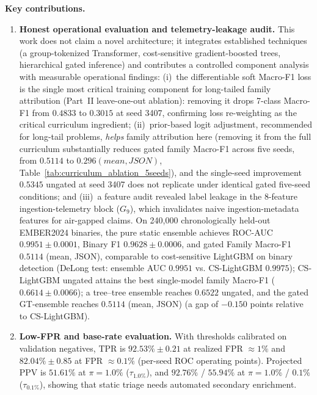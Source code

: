 \documentclass[Number]{sn-jnl}
\begin{document}
\noindent\textbf{Key contributions.}
\begin{enumerate}[leftmargin=*]
\item \textbf{Honest operational evaluation and telemetry-leakage audit.}
This work does not claim a novel architecture; it integrates established techniques (a group-tokenized Transformer, cost-sensitive gradient-boosted trees, hierarchical gated inference) and contributes a controlled component analysis with measurable operational findings: (i)~the differentiable soft Macro-F1 loss is the single most critical training component for long-tailed family attribution (Part~II leave-one-out ablation): removing it drops 7-class Macro-F1 from $0.4833$ to $0.3015$ at seed 3407, confirming loss re-weighting as the critical curriculum ingredient; (ii)~prior-based logit adjustment, recommended for long-tail problems, \emph{helps} family attribution here (removing it from the full curriculum substantially reduces gated family Macro-F1 across five seeds, from $0.5114$ to $0.296 (mean, JSON)$, Table~\ref{tab:curriculum_ablation_5seeds}), and the single-seed improvement $0.5345$ ungated at seed 3407 does not replicate under identical gated five-seed conditions; and (iii)~a feature audit revealed label leakage in the 8-feature ingestion-telemetry block ($G_9$), which invalidates naive ingestion-metadata features for air-gapped claims. On 240{,}000 chronologically held-out EMBER2024 binaries, the pure static ensemble achieves ROC-AUC $0.9951\pm0.0001$, Binary F1 $0.9628\pm0.0006$, and gated Family Macro-F1 $0.5114$ (mean, JSON), comparable to cost-sensitive LightGBM on binary detection (DeLong test: ensemble AUC $0.9951$ vs. CS-LightGBM $0.9975$); CS-LightGBM ungated attains the best single-model family Macro-F1 ($0.6614\pm0.0066$); a tree--tree ensemble reaches $0.6522$ ungated, and the gated GT-ensemble reaches $0.5114$ (mean, JSON) (a gap of $-0.150$ points relative to CS-LightGBM).

\item \textbf{Low-FPR and base-rate evaluation.}
With thresholds calibrated on validation negatives, TPR is $92.53\%\pm0.21$ at realized FPR $\approx1\%$ and $82.04\%\pm0.85$ at FPR $\approx0.1\%$ (per-seed ROC operating points). Projected PPV is $51.61\%$ at $\pi=1.0\%$ ($\tau_{1.0\%}$), and $92.76\%$ / $55.94\%$ at $\pi=1.0\%$ / $0.1\%$ ($\tau_{0.1\%}$), showing that static triage needs automated secondary enrichment.


\end{enumerate}
\end{document}
